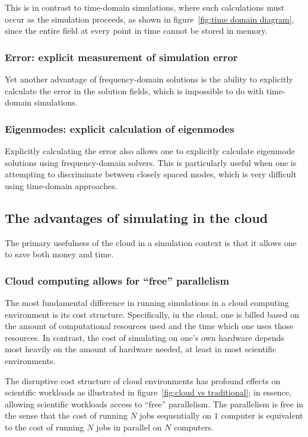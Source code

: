 \documentclass{article}
\newcommand{\fig}[1]{figure~\ref{fig:#1}}
\begin{document}
This is in contrast to time-domain simulations,
    where such calculations must occur as the simulation proceeds, 
    as shown in \fig{time domain diagram},
    since the entire field at every point in time cannot be stored in memory.

\subsubsection{Error: explicit measurement of simulation error}
Yet another advantage of frequency-domain solutions is the ability
    to explicitly calculate the error in the solution fields,
    which is impossible to do with time-domain simulations.

\subsubsection{Eigenmodes: explicit calculation of eigenmodes}
Explicitly calculating the error also allows one 
    to explicitly calculate eigenmode solutions
    using frequency-domain solvers.
This is particularly useful when one is attempting to
    discriminate between closely spaced modes,
    which is very difficult using time-domain approaches.

\subsection{The advantages of simulating in the cloud}
The primary usefulness of the cloud in a simulation context
    is that it allows one to save both money and time.

\subsubsection{Cloud computing allows for ``free'' parallelism}
The most fundamental difference in running simulations
    in a cloud computing environment is its cost structure.
Specifically, in the cloud, 
    one is billed based on the amount of computational resources used
    and the time which one uses those resources.
In contrast, the cost of simulating on one's own hardware
    depends most heavily on the amount of hardware needed,
    at least in most scientific environments.

The disruptive cost structure of cloud environments 
    has profound effects on scientific workloads 
    as illustrated in \fig{cloud vs traditional};
    in essence, allowing scientific workloads access
    to ``free'' parallelism.
The parallelism is free in the sense that 
    the cost of running $N$ jobs sequentially on $1$ computer is equivalent to 
    the cost of running $N$ jobs in parallel on $N$ computers.
\end{document}
